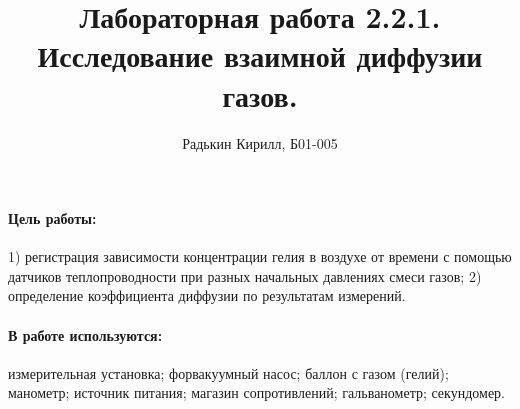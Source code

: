 \documentclass[12pt,a4paper]{article}
\author{Радькин Кирилл, Б01-005}
\title{Лабораторная работа 2.2.1. Исследование взаимной диффузии газов.}
\begin{document}
	\maketitle
	
	\paragraph{Цель работы:}
		1) регистрация зависимости концентрации гелия в воздухе от времени с помощью датчиков теплопроводности при разных начальных давлениях смеси газов; 2) определение коэффициента диффузии по результатам измерений.
		
	\paragraph{В работе используются:}
		измерительная установка; форвакуумный насос; баллон с газом (гелий); манометр; источник питания; магазин сопротивлений; гальванометр; секундомер.
		
\end{document}
